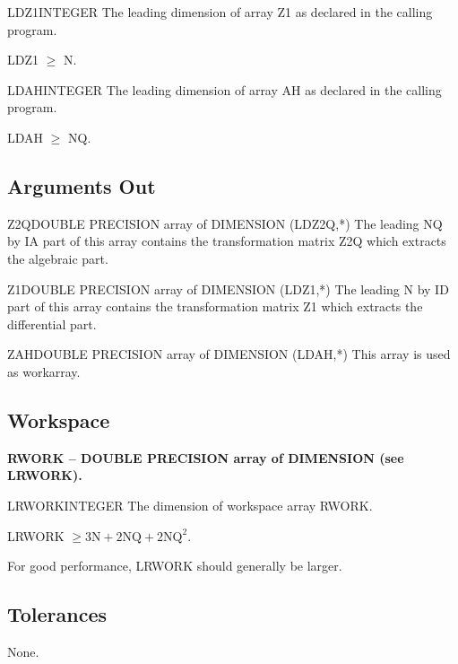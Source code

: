 \begin{entry}{LDZ1}{INTEGER}
  The leading dimension of array Z1 as declared in the calling program.

  LDZ1 $\ge$ N.
\end{entry}

\begin{entry}{LDAH}{INTEGER}
  The leading dimension of array AH as declared in the calling program.

  LDAH $\ge$ NQ.
\end{entry}

\subsection{Arguments Out}

\begin{entry}{Z2Q}{DOUBLE PRECISION array of DIMENSION (LDZ2Q,*)}
  The leading NQ by IA part of this array contains the
  transformation matrix Z2Q which extracts the algebraic part. 
\end{entry}

\begin{entry}{Z1}{DOUBLE PRECISION array of DIMENSION (LDZ1,*)}
  The leading N by ID part of this array contains the
  transformation matrix Z1 which extracts the differential part. 
\end{entry}

\begin{entry}{ZAH}{DOUBLE PRECISION array of DIMENSION (LDAH,*)}
  This array is used as workarray.
\end{entry}

\subsection{Workspace}
\noindent
{\bf RWORK -- {DOUBLE PRECISION array of DIMENSION (see LRWORK)}.}
\medskip

\begin{entry}{LRWORK}{INTEGER}
  The dimension of workspace array RWORK. 

  LRWORK $\ge 3\mbox{N} + 2\mbox{NQ} + 2\mbox{NQ}^2$.

  For good performance, LRWORK should generally be larger.
\end{entry}

\subsection{Tolerances}
None.

